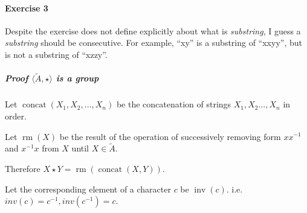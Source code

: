 \documentclass[11pt]{article}
\begin{document}
\paragraph{Exercise 3}

Despite the exercise does not define explicitly
about what is \textit{substring}, I guess a \textit{substring}
should be consecutive.
For example, ``xy'' is a substring of ``xxyy'', but is not a substring of ``xzzy''.

\subparagraph{Proof $\langle \tilde{A}, \star \rangle$ is a group}

Let $\mathop{concat}(X_1,X_2,\ldots,X_n)$ be the concatenation of strings
$X_1,X_2\ldots,X_n$ in order.

Let $\mathop{rm}(X)$ be the result of the operation of successively removing form $xx^{-1}$
and $x^{-1}x$ from $X$ until $X \in \tilde{A}$.

Therefore $X \star Y = \mathop{rm}(\mathop{concat}(X,Y))$.

Let the corresponding element of a character $c$ be $\mathop{inv}(c)$.
i.e. $inv(c) = c^{-1}, inv(c^{-1}) = c$.
\end{document}
